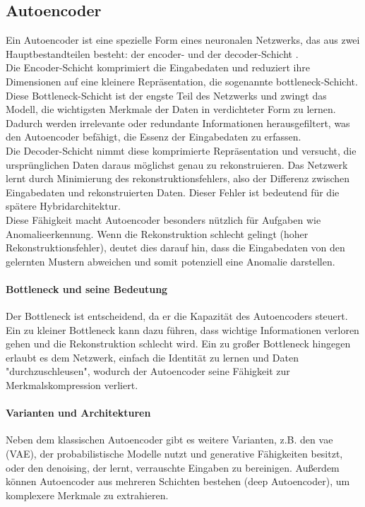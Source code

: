 \documentclass[a4paper,12pt]{article}
\begin{document}
	\subsection{Autoencoder}
	Ein Autoencoder ist eine spezielle Form eines neuronalen Netzwerks, das aus zwei Hauptbestandteilen besteht: der \gls{encoder}- und der \gls{decoder}-Schicht \cite{michelucci2022introduction}.
	\\[0.5em]
	Die Encoder-Schicht komprimiert die Eingabedaten und reduziert ihre Dimensionen auf eine kleinere Repräsentation, die sogenannte \gls{bottleneck}-Schicht. Diese Bottleneck-Schicht ist der engste Teil des Netzwerks und zwingt das Modell, die wichtigsten Merkmale der Daten in verdichteter Form zu lernen. Dadurch werden irrelevante oder redundante Informationen herausgefiltert, was den Autoencoder befähigt, die Essenz der Eingabedaten zu erfassen.
	\\[0.5em]
	Die Decoder-Schicht nimmt diese komprimierte Repräsentation und versucht, die ursprünglichen Daten daraus möglichst genau zu rekonstruieren. Das Netzwerk lernt durch Minimierung des \gls{rekonstruktionsfehler}s, also der Differenz zwischen Eingabedaten und rekonstruierten Daten. Dieser Fehler ist bedeutend für die spätere Hybridarchitektur.
	\\[0.5em]
	Diese Fähigkeit macht Autoencoder besonders nützlich für Aufgaben wie Anomalieerkennung. Wenn die Rekonstruktion schlecht gelingt (hoher Rekonstruktionsfehler), deutet dies darauf hin, dass die Eingabedaten von den gelernten Mustern abweichen und somit potenziell eine Anomalie darstellen.
	
	\paragraph{Bottleneck und seine Bedeutung}
	Der Bottleneck ist entscheidend, da er die Kapazität des Autoencoders steuert. Ein zu kleiner Bottleneck kann dazu führen, dass wichtige Informationen verloren gehen und die Rekonstruktion schlecht wird. Ein zu großer Bottleneck hingegen erlaubt es dem Netzwerk, einfach die Identität zu lernen und Daten "durchzuschleusen", wodurch der Autoencoder seine Fähigkeit zur Merkmalskompression verliert.
	
	\paragraph{Varianten und Architekturen}
	Neben dem klassischen Autoencoder gibt es weitere Varianten, z.B. den \gls{vae} (VAE), der probabilistische Modelle nutzt und generative Fähigkeiten besitzt, oder den \gls{denoising}, der lernt, verrauschte Eingaben zu bereinigen. Außerdem können Autoencoder aus mehreren Schichten bestehen (deep Autoencoder), um komplexere Merkmale zu extrahieren.
	
\end{document}
